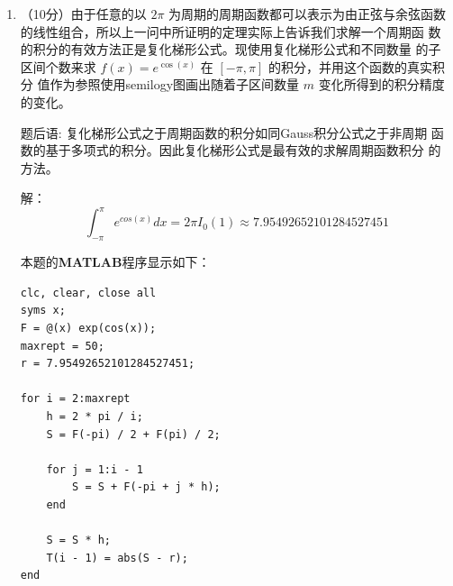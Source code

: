 \documentclass[12pt,a4paper,UTF8]{ctexart}
\theoremstyle{nonumberplain}
\begin{document}
\begin{enumerate}
\begin{enumerate}
              \item （10分）由于任意的以 $2 \pi$ 为周期的周期函数都可以表示为由正弦与余弦函数 的线性组合，所以上一问中所证明的定理实际上告诉我们求解一个周期函 数的积分的有效方法正是复化梯形公式。现使用复化梯形公式和不同数量 的子区间个数来求 $f(x)=e^{\cos (x)}$ 在 $[-\pi, \pi]$ 的积分，并用这个函数的真实积分 值作为参照使用semilogy图画出随着子区间数量 $m$ 变化所得到的积分精度 的变化。
                    \par 题后语: 复化梯形公式之于周期函数的积分如同Gauss积分公式之于非周期
                    函数的基于多项式的积分。因此复化梯形公式是最有效的求解周期函数积分 的方法。
                    \par 解：
                    $$\int_{-\pi}^{\pi} e^{cos(x)} dx =  2\pi I_0(1)\approx 7.95492652101284527451$$
                    \par 本题的\textbf{MATLAB}程序显示如下：
                    \begin{lstlisting}[frame=single]
clc, clear, close all
syms x;
F = @(x) exp(cos(x));
maxrept = 50;
r = 7.95492652101284527451;

for i = 2:maxrept
    h = 2 * pi / i;
    S = F(-pi) / 2 + F(pi) / 2;

    for j = 1:i - 1
        S = S + F(-pi + j * h);
    end

    S = S * h;
    T(i - 1) = abs(S - r);
end


\end{lstlisting}
\end{enumerate}
\end{enumerate}
\end{document}
